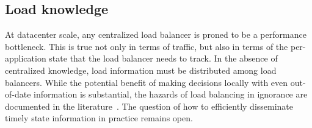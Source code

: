 

\subsection{Load knowledge}

At datacenter scale, any centralized load balancer is proned to be a performance
bottleneck. 
%
This is true not only in terms of traffic, but also in terms of the per-application state that the load balancer needs to track. 
%
In the absence of centralized knowledge, load information must
be distributed among load balancers. 
%
While the potential benefit of making decisions locally with even out-of-date information is substantial, the hazards of load balancing in ignorance are
documented in the literature~\cite{dahlin_stale_info,mitzenmacher_old_info}. 
%
The question of how to efficiently disseminate timely state information in
practice remains open.

